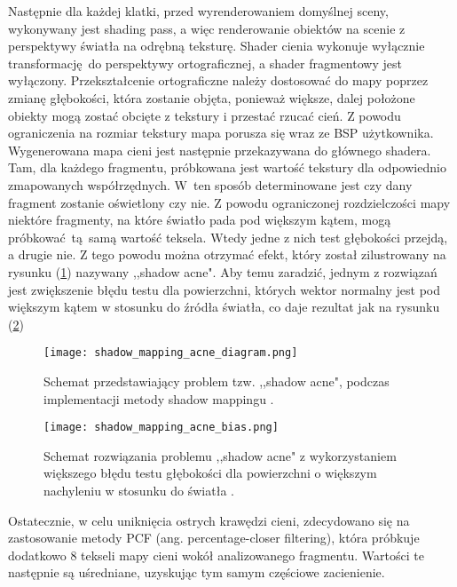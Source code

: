 Następnie dla każdej klatki, przed wyrenderowaniem domyślnej sceny, wykonywany jest shading pass, a więc renderowanie obiektów na scenie z perspektywy światła na odrębną teksturę. Shader cienia wykonuje wyłącznie transformację do perspektywy ortograficznej, a shader fragmentowy jest wyłączony. Przekształcenie ortograficzne należy dostosować do mapy poprzez zmianę głębokości, która zostanie objęta, ponieważ większe, dalej położone obiekty mogą zostać obcięte z tekstury i przestać rzucać cień. Z powodu ograniczenia na rozmiar tekstury mapa porusza się wraz ze BSP użytkownika. 
\\

Wygenerowana mapa cieni jest następnie przekazywana do głównego shadera. Tam, dla każdego fragmentu, próbkowana jest wartość tekstury dla odpowiednio zmapowanych współrzędnych. W~ten sposób determinowane jest czy dany fragment zostanie oświetlony czy nie. Z powodu ograniczonej rozdzielczości mapy niektóre fragmenty, na które światło pada pod większym kątem, mogą próbkować tą samą wartość teksela. Wtedy jedne z nich test głębokości przejdą, a drugie nie. Z tego powodu można otrzymać efekt, który został zilustrowany na rysunku (\ref{shadow_mapping_acne_diagram}) nazywany ,,shadow acne". Aby temu zaradzić, jednym z rozwiązań jest zwiększenie błędu testu dla powierzchni, których wektor normalny jest pod większym kątem w stosunku do źródła światła, co daje rezultat jak na rysunku (\ref{shadow_mapping_acne_bias})
\\

\begin{figure}[h]
	\centering
	\texttt{[image: shadow\_mapping\_acne\_diagram.png]}
	\caption{Schemat przedstawiający problem tzw. ,,shadow acne", podczas implementacji metody shadow mappingu \cite{learnopengl}.}
	\label{shadow_mapping_acne_diagram}
\end{figure}

\begin{figure}[h]
\centering
\texttt{[image: shadow\_mapping\_acne\_bias.png]}
\caption{Schemat rozwiązania problemu ,,shadow acne" z wykorzystaniem większego błędu testu głębokości dla powierzchni o większym nachyleniu w stosunku do światła \cite{learnopengl}.}
\label{shadow_mapping_acne_bias}
\end{figure}

Ostatecznie, w celu uniknięcia ostrych krawędzi cieni, zdecydowano się na zastosowanie metody PCF (ang. percentage-closer filtering), która próbkuje dodatkowo 8 tekseli mapy cieni wokół analizowanego fragmentu. Wartości te następnie są uśredniane, uzyskując tym samym częściowe zacienienie.

